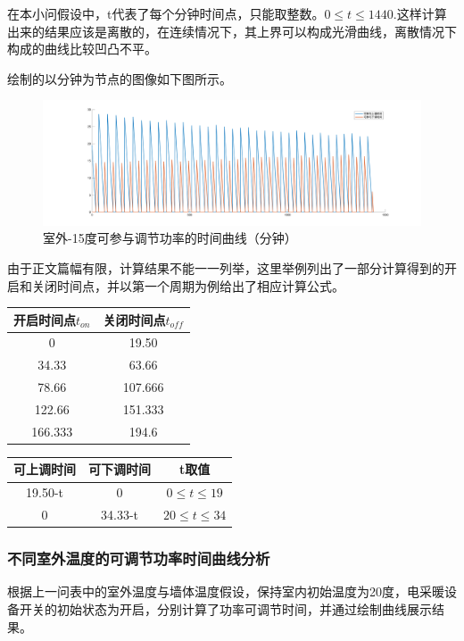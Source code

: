 \documentclass[withoutpreface,bwprint]{cumcmthesis} %
\begin{document}
在本小问假设中，t代表了每个分钟时间点，只能取整数。$0\leq t \leq 1440$.这样计算出来的结果应该是离散的，在连续情况下，其上界可以构成光滑曲线，离散情况下构成的曲线比较凹凸不平。

绘制的以分钟为节点的图像如下图所示。
\begin{figure}[H]
    \centering
        \includegraphics[width=1\textwidth]{figures/2-1minute.png}
    \caption{室外-15度可参与调节功率的时间曲线（分钟）}
    \label{fig:my_label}
    \end{figure}
由于正文篇幅有限，计算结果不能一一列举，这里举例列出了一部分计算得到的开启和关闭时间点，并以第一个周期为例给出了相应计算公式。
\begin{table}[H]
		\centering
\begin{tabular}{|c|c|}\hline
 开启时间点$t_{on}$ &关闭时间点$t_{off}$  \\ \hline
0	&19.50  \\ \hline
34.33 &	63.66  \\ \hline
78.66&	107.666\\ \hline
122.66 &	151.333 \\ \hline
166.333 &	194.6	 \\ \hline
	\end{tabular}
\end{table}
\begin{table}[H]
		\centering
\begin{tabular}{|c|c|c|}\hline
可上调时间 &可下调时间 & t取值  \\ \hline
19.50-t	& 0  & $ 0\leq t \leq 19$  \\ \hline
0 &	34.33-t  & $20\leq t \leq 34$  \\ \hline
	\end{tabular}
\end{table}
\subsubsection{不同室外温度的可调节功率时间曲线分析}
根据上一问表中的室外温度与墙体温度假设，保持室内初始温度为20度，电采暖设备开关的初始状态为开启，分别计算了功率可调节时间，并通过绘制曲线展示结果。
\end{document}
